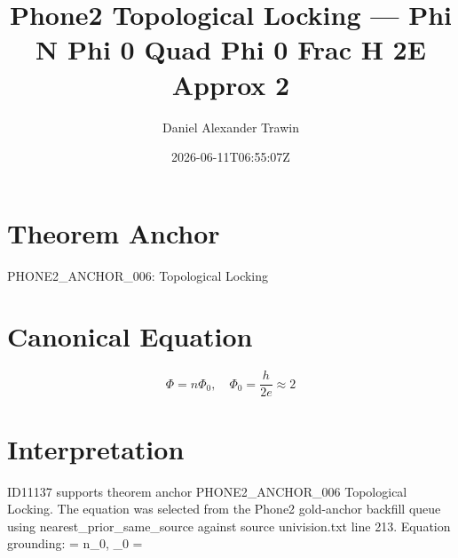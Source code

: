 \documentclass[11pt]{article}
\title{Phone2 Topological Locking — Phi N Phi 0 Quad Phi 0 Frac H 2E Approx 2}
\author{Daniel Alexander Trawin}
\date{2026-06-11T06:55:07Z}
\begin{document}
\maketitle
\section*{Theorem Anchor}
PHONE2_ANCHOR_006: Topological Locking
\section*{Canonical Equation}
\[
\Phi = n\Phi_0, \quad \Phi_0 = \frac{h}{2e} \approx 2
\]
\section*{Interpretation}
ID11137 supports theorem anchor PHONE2_ANCHOR_006 Topological Locking. The equation was selected from the Phone2 gold-anchor backfill queue using nearest_prior_same_source against source univision.txt line 213. Equation grounding: \Phi = n\Phi_0, \quad \Phi_0 =  
\end{document}
